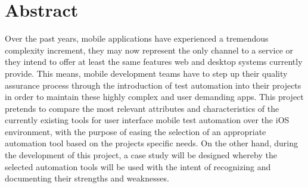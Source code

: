 %
\chapter*{Abstract}
\label{sec:abstract}
\vspace*{-10mm}

Over the past years, mobile applications have experienced a tremendous complexity increment, they may now represent the only channel to a service or they intend to offer at least the same features web and desktop systems currently provide. This means, mobile development teams have to step up their quality assurance process through the introduction of test automation into their projects in order to maintain these highly complex and user demanding apps. This project pretends to compare the most relevant attributes and characteristics of the currently existing tools for user interface mobile test automation over the iOS environment, with the purpose of easing the selection of an appropriate automation tool based on the projects specific needs. On the other hand, during the development of this project, a case study will be designed whereby the selected automation tools will be used with the intent of recognizing and documenting their strengths and weaknesses.

\vspace*{20mm}

